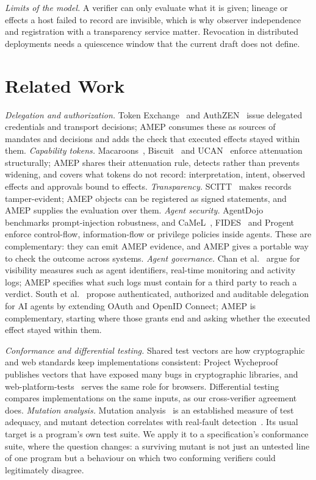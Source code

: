 \documentclass[conference]{IEEEtran}
\begin{document}
\emph{Limits of the model.} A verifier can only evaluate what it is given; lineage or effects a host failed to record are invisible, which is why observer independence and registration with a transparency service matter. Revocation in distributed deployments needs a quiescence window that the current draft does not define.

\section{Related Work}

\emph{Delegation and authorization.} Token Exchange~\cite{rfc8693} and AuthZEN~\cite{authzen} issue delegated credentials and transport decisions; AMEP consumes these as sources of mandates and decisions and adds the check that executed effects stayed within them. \emph{Capability tokens.} Macaroons~\cite{macaroons}, Biscuit~\cite{biscuit} and UCAN~\cite{ucan} enforce attenuation structurally; AMEP shares their attenuation rule, detects rather than prevents widening, and covers what tokens do not record: interpretation, intent, observed effects and approvals bound to effects. \emph{Transparency.} SCITT~\cite{scitt} makes records tamper-evident; AMEP objects can be registered as signed statements, and AMEP supplies the evaluation over them. \emph{Agent security.} AgentDojo~\cite{agentdojo} benchmarks prompt-injection robustness, and CaMeL~\cite{camel}, FIDES~\cite{fides} and Progent~\cite{progent} enforce control-flow, information-flow or privilege policies inside agents. These are complementary: they can emit AMEP evidence, and AMEP gives a portable way to check the outcome across systems. \emph{Agent governance.} Chan et al.~\cite{chan2024} argue for visibility measures such as agent identifiers, real-time monitoring and activity logs; AMEP specifies what such logs must contain for a third party to reach a verdict. South et al.~\cite{south2025} propose authenticated, authorized and auditable delegation for AI agents by extending OAuth and OpenID Connect; AMEP is complementary, starting where those grants end and asking whether the executed effect stayed within them.

\emph{Conformance and differential testing.} Shared test vectors are how cryptographic and web standards keep implementations consistent: Project Wycheproof~\cite{wycheproof} publishes vectors that have exposed many bugs in cryptographic libraries, and web-platform-tests~\cite{wpt} serves the same role for browsers. Differential testing~\cite{mckeeman1998} compares implementations on the same inputs, as our cross-verifier agreement does. \emph{Mutation analysis.} Mutation analysis~\cite{jia2011,papadakis2019} is an established measure of test adequacy, and mutant detection correlates with real-fault detection~\cite{just2014}. Its usual target is a program's own test suite. We apply it to a specification's conformance suite, where the question changes: a surviving mutant is not just an untested line of one program but a behaviour on which two conforming verifiers could legitimately disagree.
\end{document}
